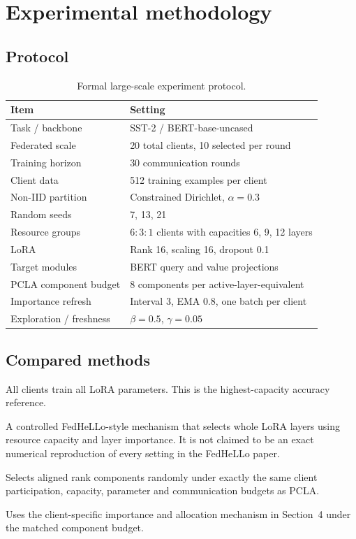 \documentclass[11pt,a4paper]{article}
\newcommand{\method}{\textsc{PCLA-Component}}
\newcommand{\fedhello}{\textsc{FedHeLLo-Controlled}}
\newcommand{\fedlora}{\textsc{FedLoRA}}
\newcommand{\randomcomp}{\textsc{Random-Component}}
\begin{document}
\section{Experimental methodology}

\subsection{Protocol}

\begin{table}[htbp]
\centering
\caption{Formal large-scale experiment protocol.}
\label{tab:protocol}
\small
\begin{tabular}{ll}
\toprule
Item & Setting\\
\midrule
Task / backbone & SST-2 / BERT-base-uncased\\
Federated scale & 20 total clients, 10 selected per round\\
Training horizon & 30 communication rounds\\
Client data & 512 training examples per client\\
Non-IID partition & Constrained Dirichlet, $\alpha=0.3$\\
Random seeds & 7, 13, 21\\
Resource groups & $6:3:1$ clients with capacities 6, 9, 12 layers\\
LoRA & Rank 16, scaling 16, dropout 0.1\\
Target modules & BERT query and value projections\\
PCLA component budget & 8 components per active-layer-equivalent\\
Importance refresh & Interval 3, EMA 0.8, one batch per client\\
Exploration / freshness & $\beta=0.5$, $\gamma=0.05$\\
\bottomrule
\end{tabular}
\end{table}

\subsection{Compared methods}

\begin{description}[style=nextline,leftmargin=0em]
  \item[\fedlora] All clients train all LoRA parameters. This is the
  highest-capacity accuracy reference.
  \item[\fedhello] A controlled FedHeLLo-style mechanism that selects whole
  LoRA layers using resource capacity and layer importance. It is not claimed
  to be an exact numerical reproduction of every setting in the FedHeLLo paper.
  \item[\randomcomp] Selects aligned rank components randomly under exactly the
  same client participation, capacity, parameter and communication budgets as
  PCLA.
  \item[\method] Uses the client-specific importance and allocation mechanism
  in Section~4 under the matched component budget.
\end{description}
\end{document}
